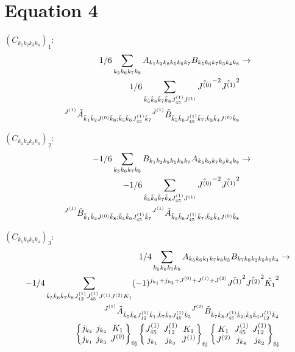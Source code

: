 \documentclass[11pt]{article}
\newcommand{\sixj}[6]{\begingroup\setlength{\arraycolsep}{0.2em}\begin{Bmatrix} #1 & #2 & #3 \\ #4 & #5 & #6 \end{Bmatrix}_{\text{6j}}\endgroup}
\begin{document}
\section{Equation 4}
$\left({C}_{{k}_{1}{k}_{2}{k}_{3}{k}_{4}}\right)_{1}$:
\begin{align}
1/6\sum_{{k}_{5}{k}_{6}{k}_{7}{k}_{8}}{A}_{{k}_{1}{k}_{2}{k}_{8}{k}_{5}{k}_{6}{k}_{7}}{B}_{{k}_{5}{k}_{6}{k}_{7}{k}_{3}{k}_{4}{k}_{8}}&\rightarrow \notag \\1/6\sum_{\tilde{k}_{5}\tilde{k}_{6}\tilde{k}_{7}\tilde{k}_{8}J^{(1)}_{45}J^{(1)}}\hat{J^{(0)}}^{-2}\hat{J^{(1)}}^{2}& \notag \\{}^{J^{(1)}}\tilde{A}_{\tilde{k}_{1}\tilde{k}_{2}J^{(0)}\tilde{k}_{8};\tilde{k}_{5}\tilde{k}_{6}J^{(1)}_{45}\tilde{k}_{7}}{}^{J^{(1)}}\tilde{B}_{\tilde{k}_{5}\tilde{k}_{6}J^{(1)}_{45}\tilde{k}_{7};\tilde{k}_{3}\tilde{k}_{4}J^{(0)}\tilde{k}_{8}}& \notag \\
\end{align}

$\left({C}_{{k}_{1}{k}_{2}{k}_{3}{k}_{4}}\right)_{2}$:
\begin{align}
-1/6\sum_{{k}_{5}{k}_{6}{k}_{7}{k}_{8}}{B}_{{k}_{1}{k}_{2}{k}_{8}{k}_{5}{k}_{6}{k}_{7}}{A}_{{k}_{5}{k}_{6}{k}_{7}{k}_{3}{k}_{4}{k}_{8}}&\rightarrow \notag \\-1/6\sum_{\tilde{k}_{5}\tilde{k}_{6}\tilde{k}_{7}\tilde{k}_{8}J^{(1)}_{45}J^{(1)}}\hat{J^{(0)}}^{-2}\hat{J^{(1)}}^{2}& \notag \\{}^{J^{(1)}}\tilde{B}_{\tilde{k}_{1}\tilde{k}_{2}J^{(0)}\tilde{k}_{8};\tilde{k}_{5}\tilde{k}_{6}J^{(1)}_{45}\tilde{k}_{7}}{}^{J^{(1)}}\tilde{A}_{\tilde{k}_{5}\tilde{k}_{6}J^{(1)}_{45}\tilde{k}_{7};\tilde{k}_{3}\tilde{k}_{4}J^{(0)}\tilde{k}_{8}}& \notag \\
\end{align}

$\left({C}_{{k}_{1}{k}_{2}{k}_{3}{k}_{4}}\right)_{3}$:
\begin{align}
1/4\sum_{{k}_{5}{k}_{6}{k}_{7}{k}_{8}}{A}_{{k}_{5}{k}_{6}{k}_{1}{k}_{7}{k}_{8}{k}_{3}}{B}_{{k}_{7}{k}_{8}{k}_{2}{k}_{5}{k}_{6}{k}_{4}}&\rightarrow \notag \\-1/4\sum_{\tilde{k}_{5}\tilde{k}_{6}\tilde{k}_{7}\tilde{k}_{8}J^{(1)}_{12}J^{(1)}_{45}J^{(1)}J^{(2)}K_{1}}(-1)^{j_{{k}_{1}} +j_{{k}_{3}} +J^{(0)} +J^{(1)} +J^{(2)} }\hat{J^{(1)}}^{2}\hat{J^{(2)}}^{2}\hat{K_{1}}^{2}& \notag \\{}^{J^{(1)}}\tilde{A}_{\tilde{k}_{5}\tilde{k}_{6}J^{(1)}_{12}\tilde{k}_{1};\tilde{k}_{7}\tilde{k}_{8}J^{(1)}_{45}\tilde{k}_{3}}{}^{J^{(2)}}\tilde{B}_{\tilde{k}_{7}\tilde{k}_{8}J^{(1)}_{45}\tilde{k}_{2};\tilde{k}_{5}\tilde{k}_{6}J^{(1)}_{12}\tilde{k}_{4}}& \notag \\\sixj{j_{{k}_{4}}}{j_{{k}_{2}}}{K_{1}}{j_{{k}_{1}}}{j_{{k}_{3}}}{J^{(0)}}\sixj{J^{(1)}_{45}}{J^{(1)}_{12}}{K_{1}}{j_{{k}_{1}}}{j_{{k}_{3}}}{J^{(1)}}\sixj{K_{1}}{J^{(1)}_{45}}{J^{(1)}_{12}}{J^{(2)}}{j_{{k}_{4}}}{j_{{k}_{2}}}
\end{align}
\end{document}
